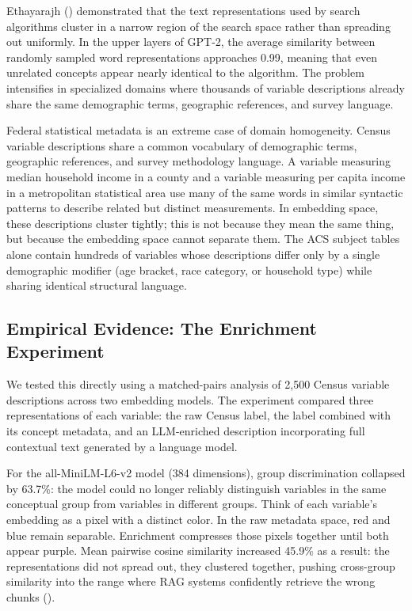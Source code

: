\documentclass[
  11pt,
  letterpaper,
]{article}
\begin{document}
Ethayarajh () demonstrated that the
text representations used by search algorithms cluster in a narrow
region of the search space rather than spreading out uniformly. In the
upper layers of GPT-2, the average similarity between randomly sampled
word representations approaches 0.99, meaning that even unrelated
concepts appear nearly identical to the algorithm. The problem
intensifies in specialized domains where thousands of variable
descriptions already share the same demographic terms, geographic
references, and survey language.

Federal statistical metadata is an extreme case of domain homogeneity.
Census variable descriptions share a common vocabulary of demographic
terms, geographic references, and survey methodology language. A
variable measuring median household income in a county and a variable
measuring per capita income in a metropolitan statistical area use many
of the same words in similar syntactic patterns to describe related but
distinct measurements. In embedding space, these descriptions cluster
tightly; this is not because they mean the same thing, but because the
embedding space cannot separate them. The ACS subject tables alone
contain hundreds of variables whose descriptions differ only by a single
demographic modifier (age bracket, race category, or household type)
while sharing identical structural language.

\subsection{Empirical Evidence: The Enrichment
Experiment}\label{empirical-evidence-the-enrichment-experiment}

We tested this directly using a matched-pairs analysis of 2,500 Census
variable descriptions across two embedding models. The experiment
compared three representations of each variable: the raw Census label,
the label combined with its concept metadata, and an LLM-enriched
description incorporating full contextual text generated by a language
model.

For the all-MiniLM-L6-v2 model (384 dimensions), group discrimination
collapsed by 63.7\%: the model could no longer reliably distinguish
variables in the same conceptual group from variables in different
groups. Think of each variable's embedding as a pixel with a distinct
color. In the raw metadata space, red and blue remain separable.
Enrichment compresses those pixels together until both appear purple.
Mean pairwise cosine similarity increased 45.9\% as a result: the
representations did not spread out, they clustered together, pushing
cross-group similarity into the range where RAG systems confidently
retrieve the wrong chunks ().
\end{document}
